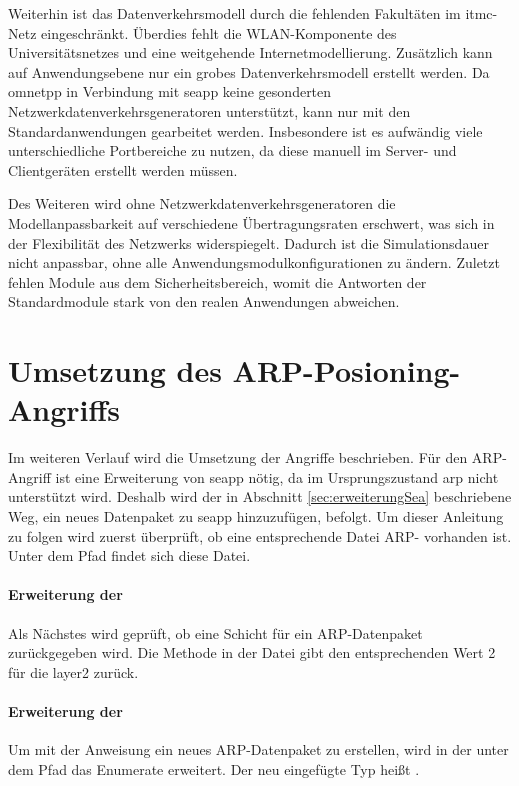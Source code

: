 Weiterhin ist das Datenverkehrsmodell durch die fehlenden Fakultäten im \gls{itmc}-Netz eingeschränkt. Überdies fehlt die WLAN-Komponente des Universitätsnetzes und eine weitgehende Internetmodellierung. Zusätzlich kann auf Anwendungsebene nur ein grobes Datenverkehrsmodell erstellt werden. Da \gls{omnetpp} in Verbindung mit \gls{seapp} keine gesonderten Netzwerkdatenverkehrsgeneratoren unterstützt, kann nur mit den Standardanwendungen gearbeitet werden. Insbesondere ist es aufwändig viele unterschiedliche Portbereiche zu nutzen, da diese manuell im Server- und Clientgeräten erstellt werden müssen.

Des Weiteren wird ohne Netzwerkdatenverkehrsgeneratoren die Modellanpassbarkeit auf verschiedene Übertragungsraten erschwert, was sich in der Flexibilität des Netzwerks widerspiegelt. Dadurch ist die Simulationsdauer nicht anpassbar, ohne alle Anwendungsmodulkonfigurationen zu ändern. Zuletzt fehlen Module aus dem Sicherheitsbereich, womit die Antworten der Standardmodule stark von den realen Anwendungen abweichen. 

\section{Umsetzung des ARP-Posioning-Angriffs}
Im weiteren Verlauf wird die Umsetzung der Angriffe beschrieben. Für den ARP-Angriff ist eine Erweiterung von \gls{seapp} nötig, da im Ursprungszustand \gls{arp} nicht unterstützt wird. Deshalb wird der in Abschnitt \ref{sec:erweiterungSea} beschriebene Weg, ein neues Datenpaket zu \gls{seapp} hinzuzufügen, befolgt. Um dieser Anleitung zu folgen wird zuerst überprüft, ob eine entsprechende Datei ARP- vorhanden ist. Unter dem Pfad  findet sich diese Datei. 

\paragraph{Erweiterung der }
Als Nächstes wird geprüft, ob eine Schicht für ein ARP-Datenpaket zurückgegeben wird. Die Methode  in der Datei  gibt den entsprechenden Wert 2 für die \gls{layer2} zurück. 

\paragraph{Erweiterung der }
Um mit der Anweisung  ein neues ARP-Datenpaket zu erstellen, wird in der  unter dem Pfad  das Enumerate  erweitert. Der neu eingefügte Typ heißt .

